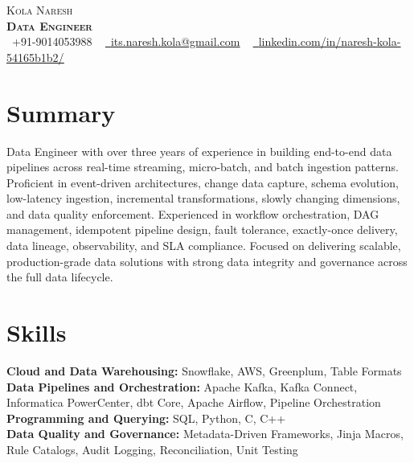 \documentclass[letterpaper,11pt]{article}
\begin{document}
\begin{center}
    {\Huge \scshape Kola Naresh} \\ \vspace{4pt}
    \textbf{\Large \scshape Data Engineer} \\ \vspace{4pt}
    \small \faPhone\ +91-9014053988 ~
    \href{mailto:its.naresh.kola@gmail.com}{\faEnvelope\ \underline{its.naresh.kola@gmail.com}} ~
    \href{https://www.linkedin.com/in/naresh-kola-54165b1b2/}{\faLinkedin\ \underline{linkedin.com/in/naresh-kola-54165b1b2/}}
\end{center}

\section{Summary}
Data Engineer with over three years of experience in building end-to-end data pipelines across real-time streaming, micro-batch, and batch ingestion patterns. Proficient in event-driven architectures, change data capture, schema evolution, low-latency ingestion, incremental transformations, slowly changing dimensions, and data quality enforcement. Experienced in workflow orchestration, DAG management, idempotent pipeline design, fault tolerance, exactly-once delivery, data lineage, observability, and SLA compliance. Focused on delivering scalable, production-grade data solutions with strong data integrity and governance across the full data lifecycle.

\section{Skills}

\textbf{Cloud and Data Warehousing:} Snowflake, AWS, Greenplum, Table Formats \\

\textbf{Data Pipelines and Orchestration:} Apache Kafka, Kafka Connect, Informatica PowerCenter, dbt Core, Apache Airflow, Pipeline Orchestration \\

\textbf{Programming and Querying:} SQL, Python, C, C++ \\

\textbf{Data Quality and Governance:} Metadata-Driven Frameworks, Jinja Macros, Rule Catalogs, Audit Logging, Reconciliation, Unit Testing \\
\end{document}

